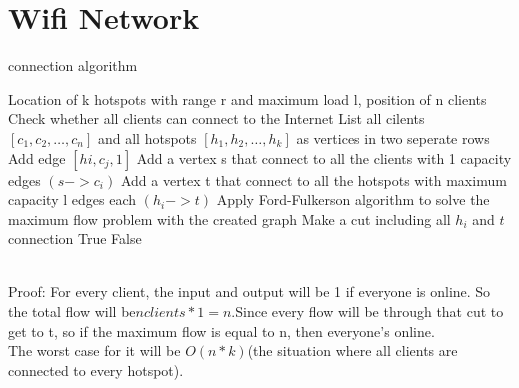\documentclass{article}
\begin{document}
\section{Wifi Network}
\begin{algorithm}
    \caption{connection algorithm}
    \begin{algorithmic}[1]
    \Require Location of k hotspots with range r and maximum load l, position of n clients
    \Ensure Check whether all clients can connect to the Internet
    \State List all cilents $[c_1, c_2, \dots, c_n]$ and all hotspots $[h_1, h_2, \dots, h_k]$ as vertices in two seperate rows
            \State Add edge $[hi, c_j, 1]$
            \EndIf
        \EndFor
    \EndFor
    \State Add a vertex s that connect to all the clients with 1 capacity edges $(s->c_i)$
    \State Add a vertex t that connect to all the hotspots with maximum capacity l edges each $(h_i->t)$
    \State Apply Ford-Fulkerson algorithm to solve the maximum flow problem with the created graph
    \State Make a cut including all $h_i$ and $t$ connection
            \Return True
        \Else
            \Return False
        \EndIf
    \end{algorithmic}
\end{algorithm}
\\Proof: For every client, the input and output will be 1 if everyone is online. So the total flow will be$ n clients *1 =n$.Since every flow will be through that cut to get to t, so if the maximum flow is equal to n, then everyone's online.
\\The worst case for it will be $O(n*k)$(the situation where all clients are connected to every hotspot).
\end{document}
